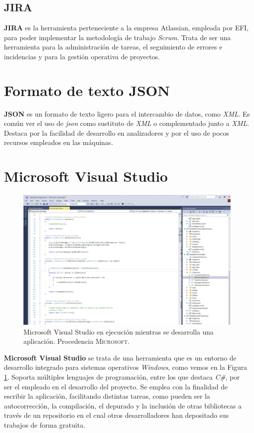 \documentclass[pdftex,11pt,a4paper]{book}
\begin{document}
\subsection{JIRA}
\textbf{JIRA} \cite{jira} es la herramienta perteneciente a la empresa Atlassian, empleada por EFI, para poder implementar la metodología de trabajo \emph{Scrum}. Trata de ser una herramienta para la administración de tareas, el seguimiento de errores e incidencias y para la gestión operativa de proyectos.

\section{Formato de texto JSON}

\textbf{JSON} \cite{json} es un formato de texto ligero para el intercambio de datos, como \emph{XML}. Es común ver el uso de \emph{json} como sustituto de \emph{XML} o complementado junto a \emph{XML}. Destaca por la facilidad de desarrollo en analizadores y por el uso de pocos recursos empleados en las máquinas. 

\section{Microsoft Visual Studio}

\begin{figure}[h]
\begin{center}
\includegraphics[width=\textwidth]{img/vs}
\caption{\label{vs}Microsoft Visual Studio en ejecución mientras se desarrolla una aplicación. Procedencia \textsc{Microsoft}\cite{visual_studio}.}
\end{center}
\end{figure}

\textbf{Microsoft Visual Studio} \cite{visual_studio} se trata de una herramienta que es un entorno de desarrollo integrado para sistemas operativos \emph{Windows}, como vemos en la Figura \ref{vs}. Soporta múltiples lenguajes de programación, entre los que destaca \textit{C\#}, por ser el empleado en el desarrollo del proyecto. Se emplea con la finalidad de escribir la aplicación, facilitando distintas tareas, como pueden ser la autocorrección, la compilación, el depurado y la inclusión de otras bibliotecas a través de un repositorio en el cual otros desarrolladores han depositado sus trabajos de forma gratuita.
\end{document}
